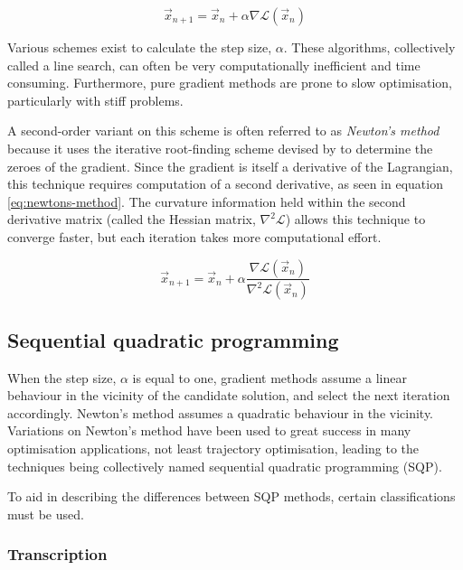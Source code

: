 \begin{equation} \label{eq:gradient-method}
\vec{x}_{n+1}=\vec{x}_n + \alpha\nabla\mathcal{L}(\vec{x}_n)
\end{equation}

Various schemes exist to calculate the step size, $\alpha$. These algorithms, collectively called a line search, can often be very computationally inefficient and time consuming. Furthermore, pure gradient methods are prone to slow optimisation, particularly with stiff problems. %

A second-order variant on this scheme is often referred to as \emph{Newton's method} because it uses the iterative root-finding scheme devised by \textcite{Newton1711, Newton1736} to determine the zeroes of the gradient. Since the gradient is itself a derivative of the Lagrangian, this technique requires computation of a second derivative, as seen in equation \eqref{eq:newtons-method}. The curvature information held within the second derivative matrix (called the Hessian matrix, $\nabla^2\mathcal{L}$) allows this technique to converge faster, but each iteration takes more computational effort.

\begin{equation} \label{eq:newtons-method}
\vec{x}_{n+1}=\vec{x}_n + \alpha\frac{\nabla\mathcal{L}(\vec{x}_n)}{\nabla^2\mathcal{L}(\vec{x}_n)}
\end{equation}

\subsection{Sequential quadratic programming} \label{sub:SQP}

When the step size, $\alpha$ is equal to one, gradient methods assume a linear behaviour in the vicinity of the candidate solution, and select the next iteration accordingly. Newton's method assumes a quadratic behaviour in the vicinity. Variations on Newton's method have been used to great success in many optimisation applications, not least trajectory optimisation, leading to the techniques being collectively named sequential quadratic programming (SQP). 

To aid in describing the differences between SQP methods, certain classifications must be used.



\subsubsection{Transcription}


